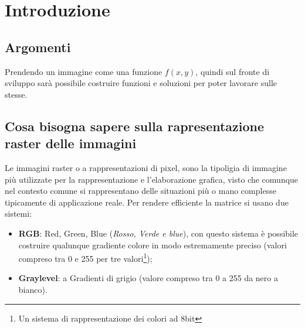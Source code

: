 \chapter{Introduzione}
\label{chap:Intro}

\section{Argomenti}
\label{sec:argomento}
Prendendo un immagine come una funzione $f(x,y)$, quindi sul fronte di
sviluppo sarà possibile costruire funzioni e soluzioni per poter
lavorare sulle stesse.

\section{Cosa bisogna sapere sulla rapresentazione raster delle immagini}
\label{sec:raster}

Le immagini raster o a rappresentazioni di pixel, sono la tipoligia di
immagine più utilizzate per la rappresentazione e l'elaborazione grafica,
visto che comunque nel contesto comune si rappresentano delle situazioni
più o mano complesse tipicamente di applicazione reale. Per rendere
efficiente la matrice si usano due sistemi:
\begin{itemize}
\item \textbf{RGB}: Red, Green, Blue (\textit{{\color{red}Rosso}, {\color{green}Verde} e {\color{blue}blue}}), con questo
  sistema è possibile costruire qualunque gradiente colore in modo
  estremamente preciso (valori compreso tra 0 e 255 per tre valori\footnote{Un sistema di rappresentazione dei colori ad 8bit});
\item \textbf{Graylevel}: a Gradienti di grigio (valore compreso tra 0 a
  255 da nero a bianco).
\end{itemize}
